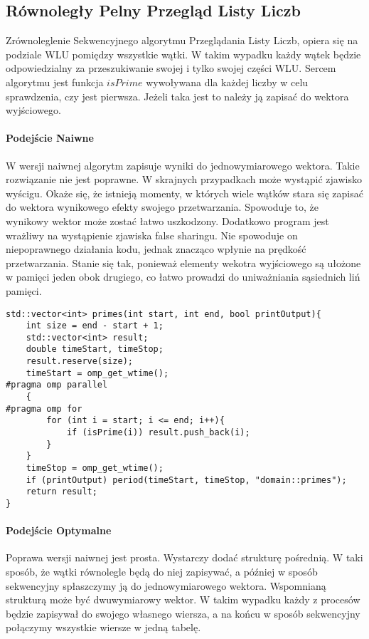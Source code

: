 \documentclass{article}
\begin{document}
            \subsection{Równoległy Pelny Przegląd Listy Liczb}
                Zrównoleglenie Sekwencyjnego algorytmu Przeglądania Listy Liczb, opiera się na podziale \gls{WLU} pomiędzy wszystkie wątki. W takim wypadku każdy wątek będzie odpowiedzialny za przeszukiwanie swojej i tylko swojej części \gls{WLU}. Sercem algorytmu jest funkcja $isPrime$ wywoływana dla każdej liczby w celu sprawdzenia, czy jest pierwsza. Jeżeli taka jest to należy ją zapisać do wektora wyjściowego.
                \paragraph{Podejście Naiwne}
                    W wersji naiwnej algorytm zapisuje wyniki do jednowymiarowego wektora. Takie rozwiązanie nie jest poprawne. W skrajnych przypadkach może wystąpić zjawisko wyścigu. Okaże się, że istnieją momenty, w których wiele wątków stara się zapisać do wektora wynikowego efekty swojego przetwarzania. Spowoduje to, że wynikowy wektor może zostać łatwo uszkodzony. Dodatkowo program jest wrażliwy na wystąpienie zjawiska false sharingu. Nie spowoduje on niepoprawnego działania kodu, jednak znacząco wpłynie na prędkość przetwarzania. Stanie się tak, ponieważ elementy wekotra wyjściowego są ułożone w pamięci jeden obok drugiego, co łatwo prowadzi do uniważniania sąsiednich liń pamięci. 
                    \begin{verbatim}
std::vector<int> primes(int start, int end, bool printOutput){
    int size = end - start + 1;
    std::vector<int> result;
    double timeStart, timeStop;
    result.reserve(size);
    timeStart = omp_get_wtime();
#pragma omp parallel
    {
#pragma omp for
        for (int i = start; i <= end; i++){
            if (isPrime(i)) result.push_back(i);
        }
    }
    timeStop = omp_get_wtime();
    if (printOutput) period(timeStart, timeStop, "domain::primes");
    return result;
}
                    \end{verbatim}
                
                \paragraph{Podejście Optymalne}
                    Poprawa wersji naiwnej jest prosta. Wystarczy dodać strukturę pośrednią. W taki sposób, że wątki równolegle będą do niej zapisywać, a później w sposób sekwencyjny spłaszczymy ją do jednowymiarowego wektora. Wspomnianą strukturą może być dwuwymiarowy wektor. W takim wypadku każdy z procesów będzie zapisywał do swojego własnego wiersza, a na końcu w sposób sekwencyjny połączymy wszystkie wiersze w jedną tabelę.
                    
\end{document}

